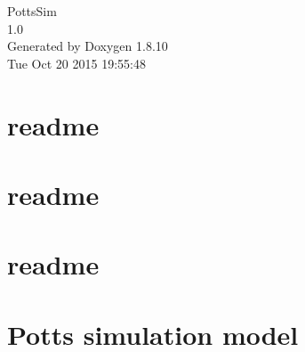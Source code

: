 \documentclass[twoside]{book}
\newcommand{\+}{\discretionary{\mbox{\scriptsize$\hookleftarrow$}}{}{}}
\newcommand{\clearemptydoublepage}{%
  \newpage{\pagestyle{empty}\cleardoublepage}%
}
\begin{document}
\hypersetup{pageanchor=false,
             bookmarks=true,
             bookmarksnumbered=true,
             pdfencoding=unicode
            }
\begin{titlepage}
\vspace*{7cm}
\begin{center}%
{\Large Potts\+Sim \\[1ex]\large 1.\+0 }\\
\vspace*{1cm}
{\large Generated by Doxygen 1.8.10}\\
\vspace*{0.5cm}
{\small Tue Oct 20 2015 19:55:48}\\
\end{center}
\end{titlepage}
\clearemptydoublepage
\tableofcontents
\clearemptydoublepage
{}
\hypersetup{pageanchor=true}

\chapter{readme}
\label{md__home_deathquasar__projects__m_h_p_c__thesis__code__potts_code_bench_readme}
\hypertarget{md__home_deathquasar__projects__m_h_p_c__thesis__code__potts_code_bench_readme}{}

\chapter{readme}
\label{md__home_deathquasar__projects__m_h_p_c__thesis__code__potts_code_bench_reports_ulisseno_exit_bench_readme}
\hypertarget{md__home_deathquasar__projects__m_h_p_c__thesis__code__potts_code_bench_reports_ulisseno_exit_bench_readme}{}

\chapter{readme}
\label{md__home_deathquasar__projects__m_h_p_c__thesis__code__potts_code_bench_standard_readme}
\hypertarget{md__home_deathquasar__projects__m_h_p_c__thesis__code__potts_code_bench_standard_readme}{}

\chapter{Potts simulation model}
\label{md__home_deathquasar__projects__m_h_p_c__thesis__code__potts_code_readme}
\hypertarget{md__home_deathquasar__projects__m_h_p_c__thesis__code__potts_code_readme}{}

\end{document}
